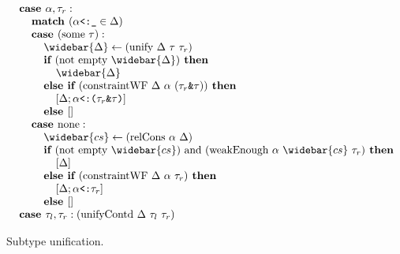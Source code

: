 \documentclass[acmsmall]{acmart}
\begin{document}
\begin{figure*}[h]
\[\begin{array}[t]{@{} l}
    \I \B{case } \alpha, \tau_r : 
    \\
    \I\I \B{match } (\code{$\alpha$<:\_} \in \Delta)
    \\
    \I\I \B{case } (\F{some } \tau) :
    \\
    \I\I\I \widebar{\Delta} \leftarrow (\F{unify } \Delta\ \tau\ \tau_r)
    \\
    \I\I\I \B{if } (\F{not } \F{empty } \widebar{\Delta}) \B{ then }
    \\
    \I\I\I\I \widebar{\Delta}
    \\
    \I\I\I \B{else if } (\F{constraintWF } \Delta\ \alpha\ (\code{$\tau_r$\&$\tau$})) \B{ then }
    \\
    \I\I\I\I [\Delta;\code{$\alpha$<:($\tau_r$\&$\tau$)}]
    \\
    \I\I\I \B{else } [] 
    \\
    \I\I \B{case } \F{none} :
    \\
    \I\I\I \widebar{cs} \leftarrow (\F{relCons } \alpha\ \Delta)  
    \\
    \I\I\I \B{if } (\F{not } \F{empty } \widebar{cs}) \F{ and } 
    (\F{weakEnough } \alpha\ \widebar{cs}\ \tau_r) \B{ then }
    \\
    \I\I\I\I [\Delta]
    \\
    \I\I\I \B{else if } (\F{constraintWF } \Delta\ \alpha\ \tau_r) \B{ then }
    \\
    \I\I\I\I [\Delta;\code{$\alpha$<:$\tau_r$}] 
    \\
    \I\I\I \B{else } []

    \\

    \I \B{case } \tau_l, \tau_r : (\text{unifyContd } \Delta\ \tau_l\ \tau_r)


\end{array}
\]

\caption{Subtype unification.}
\end{figure*}
\end{document}
